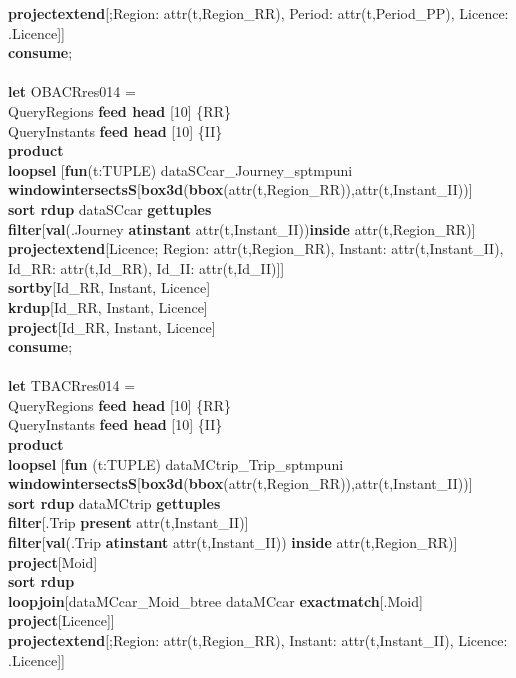 \documentclass[a4paper]{article}
\newcommand{\op}[1]{\textbf{#1}}
\begin{document}
\begin{scriptsize}
\begin{tabbing}
\>\>\op{projectextend}[;Region: attr(t,Region\_RR), Period: attr(t,Period\_PP), Licence: .Licence]]\\
\op{consume};\\
\\
\op{let} OBACRres014 =\\
\>QueryRegions  \op{feed head} [10] \{RR\}\\
\>QueryInstants \op{feed head} [10] \{II\}\\
\>\op{product}\\
\>\op{loopsel} [\op{fun}(t:TUPLE) dataSCcar\_Journey\_sptmpuni  \op{windowintersectsS}[\op{box3d}(\op{bbox}(attr(t,Region\_RR)),attr(t,Instant\_II))]\\
\>\>\op{sort rdup} dataSCcar  \op{gettuples}\\
\>\>\op{filter}[\op{val}(.Journey \op{atinstant} attr(t,Instant\_II))\op{inside} attr(t,Region\_RR)]\\
\>\>\op{projectextend}[Licence; Region: attr(t,Region\_RR), Instant: attr(t,Instant\_II), Id\_RR: attr(t,Id\_RR), Id\_II: attr(t,Id\_II)]]\\
\>\op{sortby}[Id\_RR, Instant, Licence]\\
\>\op{krdup}[Id\_RR, Instant, Licence]\\
\>\op{project}[Id\_RR, Instant, Licence]\\
\op{consume};\\
\\
\op{let} TBACRres014 =\\
\>QueryRegions  \op{feed head} [10] \{RR\}\\
\>QueryInstants \op{feed head} [10] \{II\}\\
\>\op{product}\\
\>\op{loopsel} [\op{fun} (t:TUPLE) dataMCtrip\_Trip\_sptmpuni \op{windowintersectsS}[\op{box3d}(\op{bbox}(attr(t,Region\_RR)),attr(t,Instant\_II))]\\
\>\>\op{sort rdup} dataMCtrip \op{gettuples}\\
\>\>\op{filter}[.Trip \op{present} attr(t,Instant\_II)]\\
\>\>\op{filter}[\op{val}(.Trip \op{atinstant} attr(t,Instant\_II)) \op{inside} attr(t,Region\_RR)]\\
\>\>\op{project}[Moid]\\
\>\>\op{sort rdup}\\
\>\>\op{loopjoin}[dataMCcar\_Moid\_btree dataMCcar \op{exactmatch}[.Moid] \op{project}[Licence]]\\
\>\>\op{projectextend}[;Region: attr(t,Region\_RR), Instant: attr(t,Instant\_II), Licence: .Licence]]\\

\end{tabbing}
\end{scriptsize}
\end{document}

